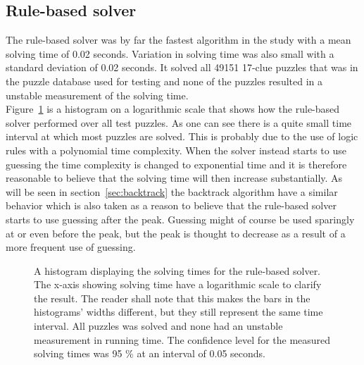 \documentclass[a4paper,11pt]{kth-mag}
\begin{document}
\FloatBarrier
\subsection{Rule-based solver}
The rule-based solver was by far the fastest algorithm in the study with a mean solving time of 0.02 seconds.
Variation in solving time was also small with a standard deviation of 0.02 seconds. 
It solved all 49151 17-clue puzzles that was in the puzzle database used for testing and none of the puzzles resulted in a unstable measurement of the solving time.
\\
Figure~\ref{fig:rulebasedHistogram} is a histogram on a logarithmic scale that shows how the rule-based solver performed over all test puzzles.
As one can see there is a quite small time interval at which most puzzles are solved.
This is probably due to the use of logic rules with a polynomial time complexity.
When the solver instead starts to use guessing the time complexity is changed to exponential time and it is therefore reasonable to believe that the solving time will then increase substantially.
As will be seen in section~\ref{sec:backtrack} the backtrack algorithm have a similar behavior which is also taken as a reason to believe that the rule-based solver starts to use guessing after the peak.
Guessing might of course be used sparingly at or even before the peak, but the peak is thought to decrease as a result of a more frequent use of guessing.
\\
\begin{figure}[here] 
\noindent{}
\vspace{-25pt}
\caption[Histogram with solving times for rule-based solver]{A histogram displaying the solving times for the rule-based solver. The x-axis showing solving time have a logarithmic scale to clarify the result. The reader shall note that this makes the bars in the histograms' widths different, but they still represent the same time interval. All puzzles was solved and none had an unstable measurement in running time. The confidence level for the measured solving times was 95 \% at an interval of 0.05 seconds.}
\label{fig:rulebasedHistogram}
\end{figure}
\end{document}
